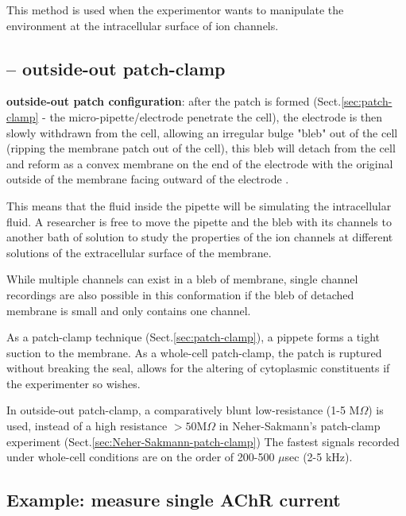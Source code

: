 This method is used when the experimentor wants to manipulate the
environment at the intracellular surface of ion channels.

\subsection{-- outside-out patch-clamp}
\label{sec:patch_clamp-outside-out}

{\bf outside-out patch configuration}: after the patch is formed
(Sect.\ref{sec:patch-clamp} - the micro-pipette/electrode penetrate
the cell), the electrode is then slowly withdrawn from the cell, allowing an
irregular bulge "bleb" out of the cell (ripping the membrane patch out of the
cell), this bleb will detach from the cell and reform as a convex membrane on
the end of the electrode with the original outside of the membrane facing
outward of the electrode \citep{hamill1981}.

This means that the fluid inside the pipette will be simulating the
intracellular fluid. A researcher is free to move the pipette and the bleb
with its channels to another bath of solution to study the properties of the
ion channels at different solutions of the extracellular surface of the
membrane.

While multiple channels can exist in a bleb of membrane, single channel
recordings are also possible in this conformation if the bleb of detached
membrane is small and only contains one channel.

As a patch-clamp technique (Sect.\ref{sec:patch-clamp}), a pippete forms a tight
suction to the membrane. As a whole-cell patch-clamp, the 
patch is ruptured without breaking the seal, allows for the altering of
cytoplasmic constituents if the experimenter so wishes.

In outside-out patch-clamp, a comparatively blunt low-resistance (1-5 M$\Omega$)
is used, instead of a high resistance $> 50$M$\Omega$ in Neher-Sakmann's
patch-clamp experiment (Sect.\ref{sec:Neher-Sakmann-patch-clamp}) The fastest
signals recorded under whole-cell conditions are on the order of 200-500
$\mu$sec (2-5 kHz).


\subsection{Example: measure single AChR current}



